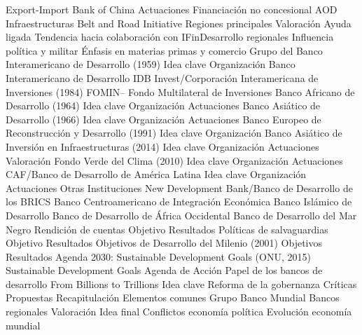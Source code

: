 \documentclass{nuevotema}
\begin{document}
\begin{esquema}[enumerate]
			\3 Export-Import Bank of China
		\2 Actuaciones
			\3 Financiación no concesional
			\3 AOD
			\3 Infraestructuras
			\3 Belt and Road Initiative
			\3 Regiones principales
		\2 Valoración
			\3 Ayuda ligada
			\3 Tendencia hacia colaboración con IFinDesarrollo regionales
			\3 Influencia política y militar
			\3 Énfasis en materias primas y comercio
	\1 
		\2 Grupo del Banco Interamericano de Desarrollo (1959)
			\3 Idea clave
			\3 Organización
			\3 Banco Interamericano de Desarrollo
			\3 IDB Invest/Corporación Interamericana de Inversiones (1984)
			\3 FOMIN-- Fondo Multilateral de Inversiones
		\2 Banco Africano de Desarrollo (1964)
			\3 Idea clave
			\3 Organización
			\3 Actuaciones
		\2 Banco Asiático de Desarrollo (1966)
			\3 Idea clave
			\3 Organización
			\3 Actuaciones
		\2 Banco Europeo de Reconstrucción y Desarrollo (1991)
			\3 Idea clave
			\3 Organización
		\2 Banco Asiático de Inversión en Infraestructuras (2014)
			\3 Idea clave
			\3 Organización
			\3 Actuaciones
			\3 Valoración
		\2 Fondo Verde del Clima (2010)
			\3 Idea clave
			\3 Organización
			\3 Actuaciones
		\2 CAF/Banco de Desarrollo de América Latina
			\3 Idea clave
			\3 Organización
			\3 Actuaciones
		\2 Otras Instituciones
			\3 New Development Bank/Banco de Desarrollo de los BRICS
			\3 Banco Centroamericano de Integración Económica
			\3 Banco Islámico de Desarrollo
			\3 Banco de Desarrollo de África Occidental
			\3 Banco de Desarrollo del Mar Negro
	\1 
		\2 Rendición de cuentas
			\3 Objetivo
			\3 Resultados
		\2 Políticas de salvaguardias
			\3 Objetivo
			\3 Resultados
		\2 Objetivos de Desarrollo del Milenio (2001)
			\3 Objetivos
			\3 Resultados
		\2 Agenda 2030: Sustainable Development Goals (ONU, 2015)
			\3 Sustainable Development Goals
			\3 Agenda de Acción
			\3 Papel de los bancos de desarrollo
		\2 From Billions to Trillions
			\3 Idea clave
		\2 Reforma de la gobernanza
			\3 Críticas
			\3 Propuestas
	\1[] 
		\2 Recapitulación
			\3 Elementos comunes
			\3 Grupo Banco Mundial
			\3 Bancos regionales
			\3 Valoración
		\2 Idea final
			\3 Conflictos economía política
			\3 Evolución economía mundial

\end{esquema}

\esquemalargo
\end{document}
